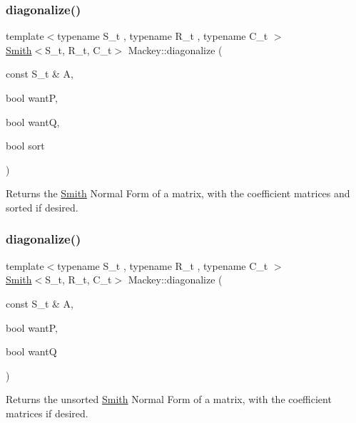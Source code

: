 \subsubsection{\texorpdfstring{diagonalize()}{diagonalize()}\hspace{0.1cm}{\footnotesize\ttfamily [1/2]}}
{\footnotesize\ttfamily template$<$typename S\+\_\+t , typename R\+\_\+t , typename C\+\_\+t $>$ \\
\hyperlink{classMackey_1_1Smith}{Smith}$<$S\+\_\+t, R\+\_\+t, C\+\_\+t$>$ Mackey\+::diagonalize (\begin{DoxyParamCaption}\item[{const S\+\_\+t \&}]{A,  }\item[{bool}]{wantP,  }\item[{bool}]{wantQ,  }\item[{bool}]{sort }\end{DoxyParamCaption})}



Returns the \hyperlink{classMackey_1_1Smith}{Smith} Normal Form of a matrix, with the coefficient matrices and sorted if desired. 

\mbox{\label{namespaceMackey_a2f26791310db25c7e42bf5341fdfd48d}} 
\subsubsection{\texorpdfstring{diagonalize()}{diagonalize()}\hspace{0.1cm}{\footnotesize\ttfamily [2/2]}}
{\footnotesize\ttfamily template$<$typename S\+\_\+t , typename R\+\_\+t , typename C\+\_\+t $>$ \\
\hyperlink{classMackey_1_1Smith}{Smith}$<$S\+\_\+t, R\+\_\+t, C\+\_\+t$>$ Mackey\+::diagonalize (\begin{DoxyParamCaption}\item[{const S\+\_\+t \&}]{A,  }\item[{bool}]{wantP,  }\item[{bool}]{wantQ }\end{DoxyParamCaption})}



Returns the unsorted \hyperlink{classMackey_1_1Smith}{Smith} Normal Form of a matrix, with the coefficient matrices if desired. 

\mbox{\label{namespaceMackey_a6a5d40e69e5628ea84896ee43f4a91fa}} 
